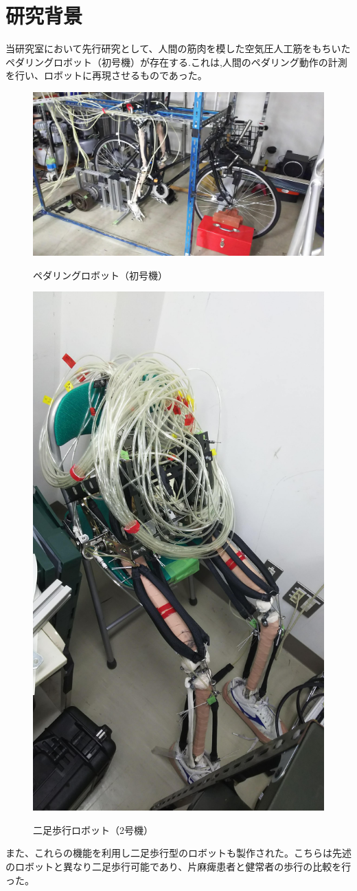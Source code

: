 \section{研究背景}
当研究室において先行研究として、人間の筋肉を模した空気圧人工筋をもちいたペダリングロボット（初号機）が存在する.これは,人間のペダリング動作の計測を行い、ロボットに再現させるものであった。
\begin{figure}[!t]
 \begin{center}
  \includegraphics[width=0.5\columnwidth,clip]{Photo/BackGround/1st.eps}
  \caption{ペダリングロボット（初号機）}
  \label{初号機}
  \includegraphics[width=0.5\columnwidth,clip]{Photo/BackGround/2nd.eps}
  \caption{二足歩行ロボット（2号機）}
  \label{2号機}
 \end{center}
\end{figure}

また、これらの機能を利用し二足歩行型のロボットも製作された。こちらは先述のロボットと異なり二足歩行可能であり、片麻痺患者と健常者の歩行の比較を行った。


